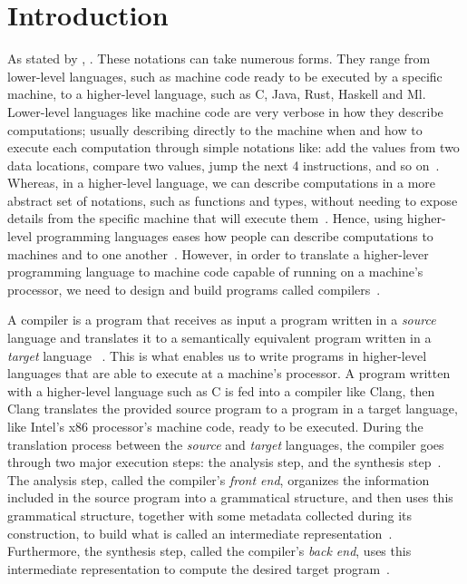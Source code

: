 \documentclass[
  oneside,
  english,
  coorientadorbanca,
  noabntexcite
]{ufsc-thesis-rn46-2019}
\begin{document}
\tableofcontents*

\textual{}

\chapter{Introduction}\label{chapter:introduction}

As stated by \textcite{Aho:2006:CPT:1177220}, .
These notations can take numerous forms.
They range from lower-level languages, such as machine code ready to be executed by a specific machine, to a higher-level language, such as C, Java, Rust, Haskell and Ml.
Lower-level languages like machine code are very verbose in how they describe computations; usually describing directly to the machine when and how to execute each computation through simple notations like: add the values from two data locations, compare two values, jump the next 4 instructions, and so on~\cite{Aho:2006:CPT:1177220}.
Whereas, in a higher-level language, we can describe computations in a more abstract set of notations, such as functions and types, without needing to expose details from the specific machine that will execute them~\cite{Aho:2006:CPT:1177220}.
Hence, using higher-level programming languages eases how people can describe computations to machines and to one another~\cite{Aho:2006:CPT:1177220}.
However, in order to translate a higher-lever programming language to machine code capable of running on a machine's processor, we need to design and build programs called compilers~\cite{Aho:2006:CPT:1177220}.

A compiler is a program that receives as input a program written in a \textit{source} language and translates it to a semantically equivalent program written in a \textit{target} language
~\cite{Aho:2006:CPT:1177220}.
This is what enables us to write programs in higher-level languages that are able to execute at a machine's processor.
A program written with a higher-level language such as C is fed into a compiler like Clang, then Clang translates the provided source program to a program in a target language, like Intel's x86 processor's machine code, ready to be executed.
During the translation process between the \textit{source} and \textit{target} languages, the compiler goes through two major execution steps: the analysis step, and the synthesis step~\cite{Aho:2006:CPT:1177220}.
The analysis step, called the compiler's \textit{front end}, organizes the information included in the source program into a grammatical structure, and then uses this grammatical structure, together with some metadata collected during its construction, to build what is called an intermediate representation~\cite{Aho:2006:CPT:1177220}.
Furthermore, the synthesis step, called the compiler's \textit{back end}, uses this intermediate representation to compute the desired target program~\cite{Aho:2006:CPT:1177220}.
\end{document}
